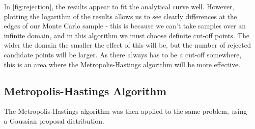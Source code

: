 \documentclass[a4paper,11pt,twoside]{article}
\begin{document}
In \cref{fig:rejection}, the results appear to fit the analytical curve well.
However, plotting the logarithm of the results allows us to see clearly differences at
the edges of our Monte Carlo sample - this is because we can't take samples over
an infinite domain, and in this algorithm we must choose definite cut-off
points. The wider the domain the smaller the effect of this will be, but the
number of rejected candidate points will be larger. As there always has to be a
cut-off somewhere, this is an area where the Metropolis-Hastings algorithm will
be more effective. 

\subsection{Metropolis-Hastings Algorithm} 
The Metropolis-Hastings algorithm was then applied to the same problem, using a
Gaussian proposal distribution. 
\end{document}
